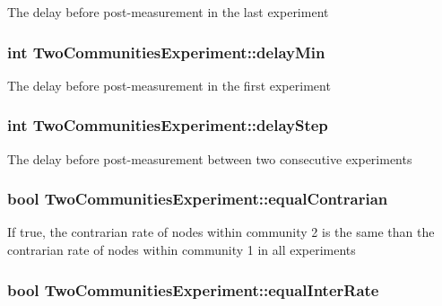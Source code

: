 The delay before post-\/measurement in the last experiment \hypertarget{class_two_communities_experiment_a861de92ba064381cf31010a57470a4b2}{
\subsubsection[{delay\-Min}]{\setlength{\rightskip}{0pt plus 5cm}int Two\-Communities\-Experiment\-::delay\-Min}}\label{class_two_communities_experiment_a861de92ba064381cf31010a57470a4b2}
The delay before post-\/measurement in the first experiment \hypertarget{class_two_communities_experiment_a4f91ecade73ca085cfba2015e38b6b33}{
\subsubsection[{delay\-Step}]{\setlength{\rightskip}{0pt plus 5cm}int Two\-Communities\-Experiment\-::delay\-Step}}\label{class_two_communities_experiment_a4f91ecade73ca085cfba2015e38b6b33}
The delay before post-\/measurement between two consecutive experiments \hypertarget{class_two_communities_experiment_a025e1c71fcd6c77612e4ef6005ddef4d}{
\subsubsection[{equal\-Contrarian}]{\setlength{\rightskip}{0pt plus 5cm}bool Two\-Communities\-Experiment\-::equal\-Contrarian}}\label{class_two_communities_experiment_a025e1c71fcd6c77612e4ef6005ddef4d}
If true, the contrarian rate of nodes within community 2 is the same than the contrarian rate of nodes within community 1 in all experiments \hypertarget{class_two_communities_experiment_a18e10411ee94d1695a3d365e49ab9976}{
\subsubsection[{equal\-Inter\-Rate}]{\setlength{\rightskip}{0pt plus 5cm}bool Two\-Communities\-Experiment\-::equal\-Inter\-Rate}}\label{class_two_communities_experiment_a18e10411ee94d1695a3d365e49ab9976}
